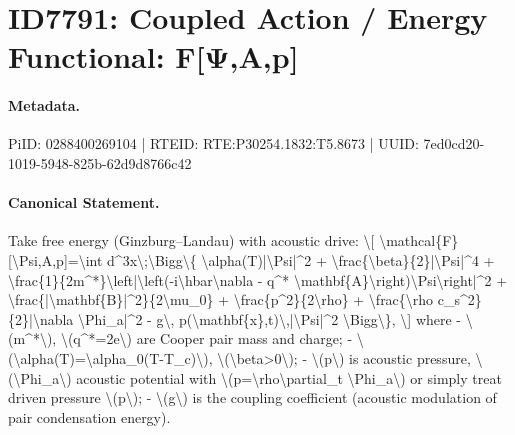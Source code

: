 \section*{ID7791: Coupled Action / Energy Functional: F[Ψ,A,p]}
\paragraph{Metadata.}
PiID: 0288400269104 | RTEID: RTE:P30254.1832:T5.8673 | UUID: 7ed0cd20-1019-5948-825b-62d9d8766c42

\paragraph{Canonical Statement.}
Take free energy (Ginzburg–Landau) with acoustic drive: \textbackslash{}[ \textbackslash{}mathcal\{F\}[\textbackslash{}Psi,A,p]=\textbackslash{}int d\textasciicircum{}3x\textbackslash{};\textbackslash{}Bigg\textbackslash{}\{ \textbackslash{}alpha(T)|\textbackslash{}Psi|\textasciicircum{}2 + \textbackslash{}frac\{\textbackslash{}beta\}\{2\}|\textbackslash{}Psi|\textasciicircum{}4 + \textbackslash{}frac\{1\}\{2m\textasciicircum{}*\}\textbackslash{}left|\textbackslash{}left(-i\textbackslash{}hbar\textbackslash{}nabla - q\textasciicircum{}* \textbackslash{}mathbf\{A\}\textbackslash{}right)\textbackslash{}Psi\textbackslash{}right|\textasciicircum{}2 + \textbackslash{}frac\{|\textbackslash{}mathbf\{B\}|\textasciicircum{}2\}\{2\textbackslash{}mu\_0\} + \textbackslash{}frac\{p\textasciicircum{}2\}\{2\textbackslash{}rho\} + \textbackslash{}frac\{\textbackslash{}rho c\_s\textasciicircum{}2\}\{2\}|\textbackslash{}nabla \textbackslash{}Phi\_a|\textasciicircum{}2 - g\textbackslash{}, p(\textbackslash{}mathbf\{x\},t)\textbackslash{},|\textbackslash{}Psi|\textasciicircum{}2 \textbackslash{}Bigg\textbackslash{}\}, \textbackslash{}] where - \textbackslash{}(m\textasciicircum{}*\textbackslash{}), \textbackslash{}(q\textasciicircum{}*=2e\textbackslash{}) are Cooper pair mass and charge; - \textbackslash{}(\textbackslash{}alpha(T)=\textbackslash{}alpha\_0(T-T\_c)\textbackslash{}), \textbackslash{}(\textbackslash{}beta>0\textbackslash{}); - \textbackslash{}(p\textbackslash{}) is acoustic pressure, \textbackslash{}(\textbackslash{}Phi\_a\textbackslash{}) acoustic potential with \textbackslash{}(p=\textbackslash{}rho\textbackslash{}partial\_t \textbackslash{}Phi\_a\textbackslash{}) or simply treat driven pressure \textbackslash{}(p\textbackslash{}); - \textbackslash{}(g\textbackslash{}) is the coupling coefficient (acoustic modulation of pair condensation energy).


